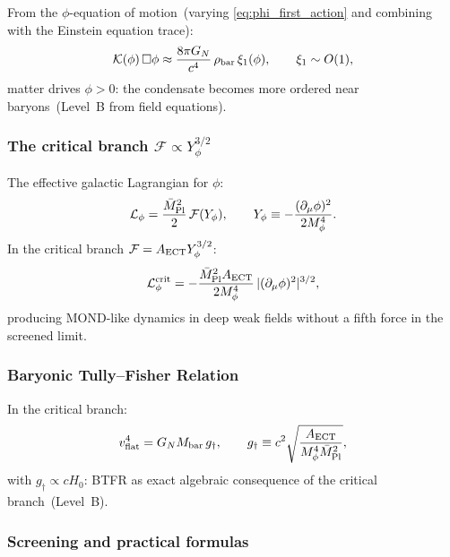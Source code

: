 From the $\phi$-equation of motion~(varying \eqref{eq:phi_first_action}
and combining with the Einstein equation trace):
\begin{equation}
  \label{eq:phi_eom}
  \mathcal{K}(\phi)\,\Box\phi \approx
  \frac{8\pi G_N}{c^4}\,\rho_{\rm bar}\,\xi_1(\phi),
  \qquad \xi_1\sim O(1),
\end{equation}
matter drives $\phi>0$: the condensate becomes more ordered near
baryons~(Level~B from field equations).

\subsubsection*{The critical branch $\mathcal{F}\propto Y_\phi^{3/2}$}

The effective galactic Lagrangian for $\phi$:
\begin{equation}
  \label{eq:phi_galactic}
  \mathcal{L}_\phi = \frac{\bar M_{\rm Pl}^2}{2}\,\mathcal{F}(Y_\phi),
  \qquad
  Y_\phi \equiv -\frac{(\partial_\mu\phi)^2}{2M_\phi^4}.
\end{equation}
In the critical branch $\mathcal{F}=A_{\rm ECT}Y_\phi^{3/2}$:
\begin{equation}
  \label{eq:critical_branch}
  \mathcal{L}_\phi^{\rm crit}
  = -\frac{\bar M_{\rm Pl}^2 A_{\rm ECT}}{2M_\phi^4}\,
  |(\partial_\mu\phi)^2|^{3/2},
\end{equation}
producing MOND-like dynamics in deep weak fields without a fifth force
in the screened limit.

\subsubsection*{Baryonic Tully--Fisher Relation}

In the critical branch:
\begin{equation}
  \label{eq:BTFR}
  v_{\rm flat}^4 = G_N M_{\rm bar}\,g_\dagger,
  \qquad
  g_\dagger \equiv c^2\sqrt{\frac{A_{\rm ECT}}{M_\phi^4\bar M_{\rm Pl}^2}},
\end{equation}
with $g_\dagger\propto cH_0$: BTFR as exact algebraic consequence of the
critical branch~(Level~B).

\subsubsection*{Screening and practical formulas}

